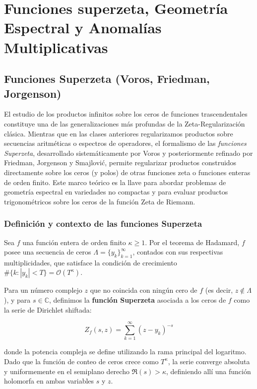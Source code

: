\chapter{Funciones superzeta, Geometría Espectral y Anomalías Multiplicativas}

\section{Funciones Superzeta (Voros, Friedman, Jorgenson)}

El estudio de los productos infinitos sobre los ceros de funciones trascendentales constituye una de las generalizaciones más profundas de la Zeta-Regularización clásica. Mientras que en las clases anteriores regularizamos productos sobre secuencias aritméticas o espectros de operadores, el formalismo de las \textit{funciones Superzeta}, desarrollado sistemáticamente por Voros y posteriormente refinado por Friedman, Jorgenson y Smajlović, permite regularizar productos construidos directamente sobre los ceros (y polos) de otras funciones zeta o funciones enteras de orden finito. Este marco teórico es la llave para abordar problemas de geometría espectral en variedades no compactas y para evaluar productos trigonométricos sobre los ceros de la función Zeta de Riemann.

\subsection{Definición y contexto de las funciones Superzeta}

Sea $f$ una función entera de orden finito $\kappa \ge 1$. Por el teorema de Hadamard, $f$ posee una secuencia de ceros $\Lambda = \{y_k\}_{k=1}^{\infty}$, contados con sus respectivas multiplicidades, que satisface la condición de crecimiento $\#\{k : |y_k| < T\} = \mathcal{O}(T^\kappa)$. 

Para un número complejo $z$ que no coincida con ningún cero de $f$ (es decir, $z \notin \Lambda$), y para $s \in \mathbb{C}$, definimos la \textbf{función Superzeta} asociada a los ceros de $f$ como la serie de Dirichlet shiftada:

$$ Z_f(s, z) = \sum_{k=1}^{\infty} (z - y_k)^{-s} $$

donde la potencia compleja se define utilizando la rama principal del logaritmo. Dado que la función de conteo de ceros crece como $T^\kappa$, la serie converge absoluta y uniformemente en el semiplano derecho $\Re(s) > \kappa$, definiendo allí una función holomorfa en ambas variables $s$ y $z$.

